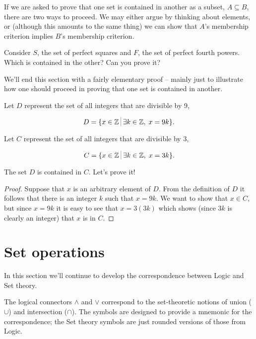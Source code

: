 If we are asked to prove that one set is contained in another as a subset,
$A \subseteq B$, there are two ways to proceed.  We may either argue by
thinking about elements, or (although this amounts to the same thing) 
we can show that $A$'s membership criterion
implies $B$'s membership criterion.

\begin{exer}
Consider $S$, the set of perfect squares and $F$, the set of perfect fourth
powers.  Which is contained in the other?  Can you prove it?
\end{exer}

We'll end this section with a fairly elementary proof -- mainly just to
illustrate how one should proceed in proving that one  set is contained in
another.

Let $D$ represent the set of all integers that are divisible by 9,

\[ D = \{ x \in \Integers \suchthat \exists k \in \Integers, \; x=9k \}. \]

Let $C$ represent the set of all integers that are divisible by 3,

\[ C = \{ x \in \Integers \suchthat \exists k \in \Integers, \; x=3k \}. \]
 
The set $D$ is contained in $C$.  Let's prove
it!

\begin{proof}
Suppose that $x$ is an arbitrary element of $D$.  From the definition
of $D$ it follows that there is an integer $k$ such that $x=9k$.  
We want to show that $x \in C$, but since $x=9k$ it is easy to 
see that $x = 3(3k)$ which shows (since $3k$ is clearly an integer)
that $x$ is in $C$.
\end{proof}

\clearpage 




\newpage

\section{Set operations}
\label{sec:set_ops}

In this section we'll continue to develop the correspondence between 
Logic and Set theory.

The logical connectors $\land$ and $\lor$ correspond to the set-theoretic
notions of 
union ($\cup$) and 
intersection ($\cap$).   The symbols are 
designed to provide a mnemonic for the correspondence; the Set theory
symbols are just rounded versions of those from Logic.

